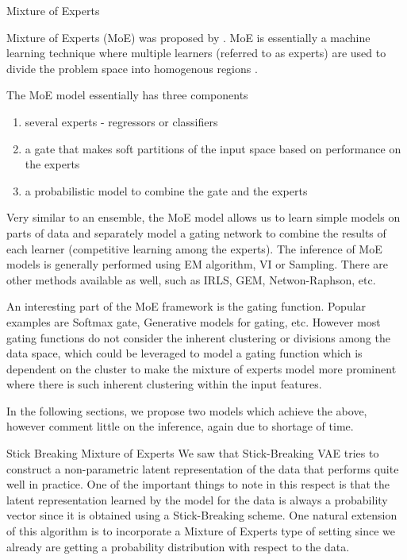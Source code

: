 \documentclass{article}
\begin{document}
\begin{psection}{Mixture of Experts}

	Mixture of Experts (MoE) was proposed by \cite{moe}. MoE is essentially a machine learning technique where multiple learners (referred to as experts) are used to divide the problem space into homogenous regions \cite{moe-survey}.

	The MoE model essentially has three components \cite{moe-lit}
	\begin{enumerate}
		\item several experts - regressors or classifiers
		\item a gate that makes soft partitions of the input space based on performance on the experts
		\item a probabilistic model to combine the gate and the experts
	\end{enumerate}

	Very similar to an ensemble, the MoE model allows us to learn simple models on parts of data and separately model a gating network to combine the results of each learner (competitive learning among the experts). The inference of MoE models is generally performed using EM algorithm, VI or Sampling. There are other methods available as well, such as IRLS, GEM, Netwon-Raphson, etc.

	An interesting part of the MoE framework is the gating function. Popular examples are Softmax gate, Generative models for gating, etc. However most gating functions do not consider the inherent clustering or divisions among the data space, which could be leveraged to model a gating function which is dependent on the cluster to make the mixture of experts model more prominent where there is such inherent clustering within the input features.

	In the following sections, we propose two models which achieve the above, however comment little on the inference, again due to shortage of time.

	\begin{psubsection}{Stick Breaking Mixture of Experts}
		We saw that Stick-Breaking VAE tries to construct a non-parametric latent representation of the data that performs quite well in practice. One of the important things to note in this respect is that the latent representation learned by the model for the data is always a probability vector since it is obtained using a Stick-Breaking scheme. One natural extension of this algorithm is to incorporate a Mixture of Experts type of setting since we already are getting a probability distribution with respect to the data.


\end{psubsection}
\end{psection}
\end{document}
